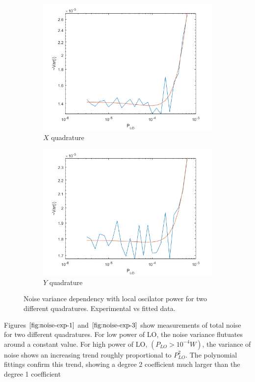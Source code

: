 %
\begin{figure}[H]
    \begin{subfigure}{.5\textwidth}
        \centering
        \includegraphics[width=.8\linewidth]{./sdf/quantum_noise/figures/noise_exp_channel1.png}
        \caption{$X$ quadrature}
        \label{fig:noise-exp-1}
    \end{subfigure}%
    \begin{subfigure}{.5\textwidth}
        \centering
        \includegraphics[width=.8\linewidth]{./sdf/quantum_noise/figures/noise_exp_channel3.png}
        \caption{$Y$ quadrature}
        \label{fig:noise-exp-3}
    \end{subfigure}
    \captionsetup{justification=centering}
    \caption{Noise variance dependency with local oscilator power for two different quadratures. Experimental vs fitted data.}
\end{figure}
%
Figures $\ref{fig:noise-exp-1}$ and $\ref{fig:noise-exp-3}$ show measurements of total noise for two different quadratures. For low power of LO, the noise variance flutuates around a constant value. For high power of LO, $(P_{LO}>10^{-4}W)$, the variance of noise shows an increasing trend roughly proportional to $P_{LO}^2$. The polynomial fittings confirm this trend, showing a degree 2 coefficient much larger than the degree 1 coefficient
